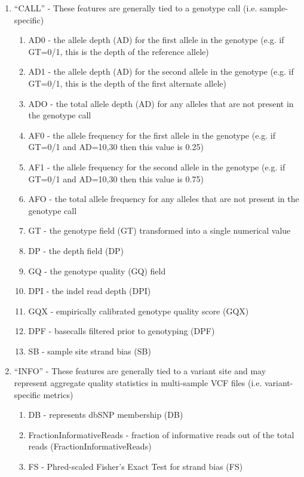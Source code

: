 \begin{enumerate}
    \item ``CALL'' - These features are generally tied to a genotype call (i.e. sample-specific)
    \begin{enumerate}
        \item AD0 - the allele depth (AD) for the first allele in the genotype (e.g. if GT=0/1, this is the depth of the reference allele)
        \item AD1 - the allele depth (AD) for the second allele in the genotype (e.g. if GT=0/1, this is the depth of the first alternate allele)
        \item ADO - the total allele depth (AD) for any alleles that are not present in the genotype call
        \item AF0 - the allele frequency for the first allele in the genotype (e.g. if GT=0/1 and AD=10,30 then this value is 0.25)
        \item AF1 - the allele frequency for the second allele in the genotype (e.g. if GT=0/1 and AD=10,30 then this value is 0.75)
        \item AFO - the total allele frequency for any alleles that are not present in the genotype call
        \item GT - the genotype field (GT) transformed into a single numerical value
        \item DP - the depth field (DP)
        \item GQ - the genotype quality (GQ) field
        \item DPI - the indel read depth (DPI)
        \item GQX - empirically calibrated genotype quality score (GQX)
        \item DPF - basecalls filtered prior to genotyping (DPF)
        \item SB - sample site strand bias (SB)
    \end{enumerate}
    \item ``INFO'' - These features are generally tied to a variant site and may represent aggregate quality statistics in multi-sample VCF files (i.e. variant-specific metrics)
    \begin{enumerate}
        \item DB - represents dbSNP membership (DB)
        \item FractionInformativeReads - fraction of informative reads out of the total reads (FractionInformativeReads)
        \item FS - Phred-scaled Fisher's Exact Test for strand bias (FS)

\end{enumerate}
\end{enumerate}
